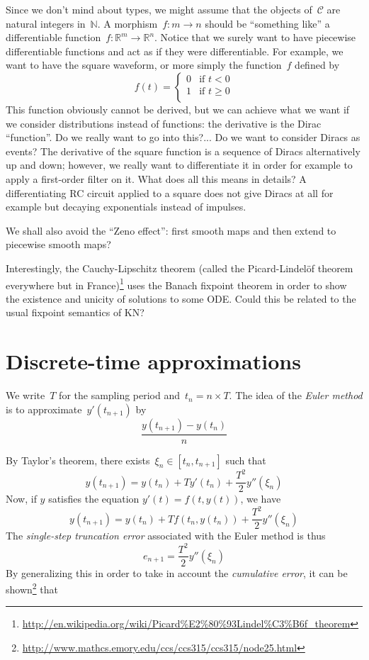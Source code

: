 \documentclass{article}
\newcommand{\N}{\mathbb{N}}
\newcommand{\R}{\mathbb{R}}
\renewcommand{\C}{\mathcal{C}}
\begin{document}
Since we don't mind about types, we might assume that the objects of~$\C$ are
natural integers in~$\N$. A morphism~$f:m\to n$ should be ``something like'' a
differentiable function~$f:\R^m\to\R^n$. Notice that we surely want to have
piecewise differentiable functions and act as if they were differentiable. For
example, we want to have the square waveform, or more simply the function~$f$
defined by
\[
f(t)=
\begin{cases}
  0&\text{if $t<0$}\\
  1&\text{if $t\geq 0$}\\
\end{cases}
\]
This function obviously cannot be derived, but we can achieve what we want if we
consider distributions instead of functions: the derivative is the Dirac
``function''. Do we really want to go into this?... Do we want to consider
Diracs as events? The derivative of the square function is a sequence of Diracs
alternatively up and down; however, we really want to differentiate it in order
for example to apply a first-order filter on it. What does all this means in
details? A differentiating RC circuit applied to a square does not give Diracs
at all for example but decaying exponentials instead of impulses.

We shall also avoid the ``Zeno effect'': first smooth maps and then extend to
piecewise smooth maps?

Interestingly, the Cauchy-Lipschitz theorem (called the Picard-Lindelöf theorem
everywhere but in
France)\footnote{\url{http://en.wikipedia.org/wiki/Picard\%E2\%80\%93Lindel\%C3\%B6f_theorem}}
uses the Banach fixpoint theorem in order to show the existence and unicity of
solutions to some ODE. Could this be related to the usual fixpoint semantics
of KN?

\section{Discrete-time approximations}
We write~$T$ for the sampling period and~$t_n=n\times T$. The idea of the
\emph{Euler method} is to approximate~$y'(t_{n+1})$ by
\[
\frac{y(t_{n+1})-y(t_n)}n
\]

By Taylor's theorem, there exists~$\xi_n\in[t_n,t_{n+1}]$ such that
\[
y(t_{n+1})=y(t_n)+Ty'(t_n)+\frac{T^2}2 y''(\xi_n)
\]
Now, if $y$ satisfies the equation $y'(t)=f(t,y(t))$, we have
\[
y(t_{n+1})=y(t_n)+Tf(t_n,y(t_n))+\frac{T^2}2 y''(\xi_n)
\]
The \emph{single-step truncation error} associated with the Euler method is thus
\[
e_{n+1}=\frac{T^2}2 y''(\xi_n)
\]
By generalizing this in order to take in account the \emph{cumulative error}, it
can be
shown\footnote{\url{http://www.mathcs.emory.edu/ccs/ccs315/ccs315/node25.html}}
that
\end{document}
